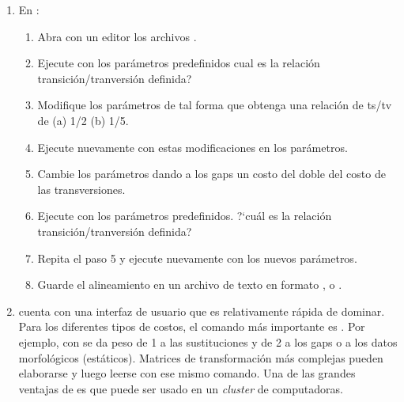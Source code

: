 \begin{enumerate}
	\item En :
		\begin{enumerate}
			\item  Abra con un editor los archivos .
			\item   Ejecute  con los par\'ametros predefinidos cual es la relaci\'on transici\'on/tranversi\'on definida?
			\item   Modifique los par\'ametros de tal forma que obtenga una relaci\'on de ts/tv de (a) 1/2 (b) 1/5.
			\item   Ejecute nuevamente  con estas modificaciones en los par\'ametros.
			\item   Cambie los par\'ametros dando a los gaps un costo del doble del costo de las transversiones.
			\item   Ejecute  con los par\'ametros predefinidos. ?`cu\'al es la relaci\'on transici\'on/tranversi\'on definida?
			\item   Repita el paso 5 y ejecute nuevamente  con los nuevos par\'ametros.
			\item   Guarde el alineamiento en un archivo de texto en formato ,  o .
		\end{enumerate}

	\item {} cuenta con una interfaz de usuario que es relativamente r\'apida de dominar. Para los diferentes tipos de costos, el comando m\'as importante es . Por ejemplo, con  se da peso de 1 a las sustituciones y de 2 a los gaps o a los datos morfol\'ogicos (est\'aticos). Matrices de transformaci\'on m\'as complejas pueden elaborarse y luego leerse con ese mismo comando. Una de las grandes ventajas de  es que puede ser usado en un {\textit{cluster}} de computadoras.
	

\end{enumerate}
